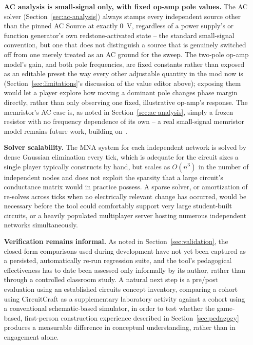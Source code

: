 \textbf{AC analysis is small-signal only, with fixed op-amp pole values.} The AC solver
(Section~\ref{sec:ac-analysis}) always stamps every independent source other than the pinned
AC Source at exactly 0~V, regardless of a power supply's or function generator's own
redstone-activated state -- the standard small-signal convention, but one that does not
distinguish a source that is genuinely switched off from one merely treated as an AC ground
for the sweep. The two-pole op-amp model's gain, and both pole frequencies, are fixed
constants rather than exposed as an editable preset the way every other adjustable quantity
in the mod now is (Section~\ref{sec:limitations}'s discussion of the value editor above);
exposing them would let a player explore how moving a dominant pole changes phase margin
directly, rather than only observing one fixed, illustrative op-amp's response. The
memristor's AC case is, as noted in Section~\ref{sec:ac-analysis}, simply a frozen resistor
with no frequency dependence of its own -- a real small-signal memristor model remains
future work, building on~\cite{gater2026smallsignal,gater2025bodeplots}.

\textbf{Solver scalability.} The MNA system for each independent network is solved by dense
Gaussian elimination every tick, which is adequate for the circuit sizes a single player
typically constructs by hand, but scales as $O(n^3)$ in the number of independent nodes and
does not exploit the sparsity that a large circuit's conductance matrix would in practice
possess. A sparse solver, or amortization of re-solves across ticks when no electrically
relevant change has occurred, would be necessary before the tool could comfortably support
very large student-built circuits, or a heavily populated multiplayer server hosting
numerous independent networks simultaneously.

\textbf{Verification remains informal.} As noted in Section~\ref{sec:validation}, the
closed-form comparisons used during development have not yet been captured as a persisted,
automatically re-run regression suite, and the tool's pedagogical effectiveness has to date
been assessed only informally by its author, rather than through a controlled classroom
study. A natural next step is a pre/post evaluation using an established circuits concept
inventory, comparing a cohort using CircuitCraft as a supplementary laboratory activity
against a cohort using a conventional schematic-based simulator, in order to test whether
the game-based, first-person construction experience described in Section~\ref{sec:pedagogy}
produces a measurable difference in conceptual understanding, rather than in engagement
alone.

